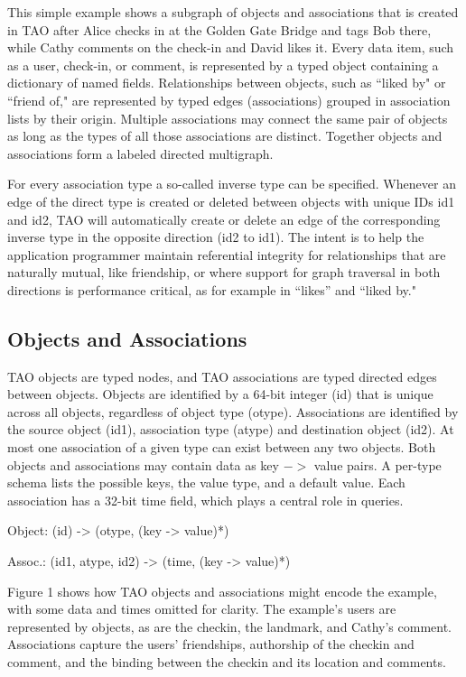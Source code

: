 \documentclass[9pt,twocolumn,twoside]{../../styles/osajnl}
\begin{document}
This simple example shows a subgraph of objects and associations that is created in TAO after Alice checks in at the Golden Gate Bridge and tags Bob there, while Cathy comments on the check-in and David likes it. Every data item, such as a user, check-in, or comment, is represented by a typed object containing a dictionary of named fields. Relationships between objects, such as “liked by" or “friend of," are represented by typed edges (associations) grouped in association lists by their origin. Multiple associations may connect the same pair of objects as long as the types of all those associations are distinct. Together objects and associations form a labeled directed multigraph.

For every association type a so-called inverse type can be specified. Whenever an edge of the direct type is created or deleted between objects with unique IDs id1 and id2, TAO will automatically create or delete an edge of the corresponding inverse type in the opposite direction (id2 to id1). The intent is to help the application programmer maintain referential integrity for relationships that are naturally mutual, like friendship, or where support for graph traversal in both directions is performance critical, as for example in “likes” and “liked by."

\subsection{Objects and Associations}
\cite{book-tao1} TAO objects are typed nodes, and TAO associations are typed directed edges between objects. Objects are identified by a 64-bit integer (id) that is unique across all objects, regardless of object type (otype). Associations are identified by the source object (id1), association type (atype) and destination object (id2). At most one association of a given type can exist between any two objects. Both objects and associations may contain data as key $->$ value pairs. A per-type schema lists the possible keys, the value type, and a default value. Each association has a 32-bit time field, which plays a central
role in queries.

Object: (id) -> (otype, (key -> value)*)

Assoc.: (id1, atype, id2) -> (time, (key -> value)*)

Figure 1 shows how TAO objects and associations might encode the example, with some data and times omitted for clarity. The example’s users are represented by objects, as are the checkin, the landmark, and Cathy’s comment. Associations capture the users’ friendships, authorship of the checkin and comment, and the binding between the checkin and its location and comments.
\end{document}
